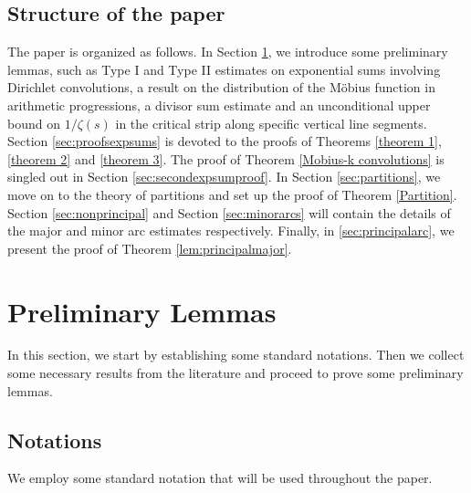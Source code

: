 \documentclass[11pt]{amsart}
\numberwithin{equation}{section}
\numberwithin{figure}{section}
\theoremstyle{definition}
\begin{document}
\subsection{Structure of the paper} The paper is organized as follows. In Section \ref{sec:preliminaries}, we introduce some preliminary lemmas, such as Type I and Type II estimates on exponential sums involving Dirichlet convolutions, a result on the distribution of the M\"{o}bius function in arithmetic progressions, a divisor sum estimate and an unconditional upper bound on $1/\zeta(s)$ in the critical strip along specific vertical line segments. Section \ref{sec:proofsexpsums} is devoted to the proofs of Theorems \ref{theorem 1}, \ref{theorem 2} and \ref{theorem 3}. The proof of Theorem \ref{Mobius-k convolutions} is singled out in Section \ref{sec:secondexpsumproof}. In Section \ref{sec:partitions}, we move on to the theory of partitions and set up the proof of Theorem \ref{Partition}. Section \ref{sec:nonprincipal} and Section \ref{sec:minorarcs} will contain the details of the major and minor arc estimates respectively. Finally, in \ref{sec:principalarc}, we present the proof of Theorem \ref{lem:principalmajor}.

\section{Preliminary Lemmas} \label{sec:preliminaries}
In this section, we start by establishing some standard notations. Then we collect some necessary results from the literature and proceed to prove some preliminary lemmas. 
\subsection{Notations} We employ some standard notation that will be used throughout the paper.
\end{document}
